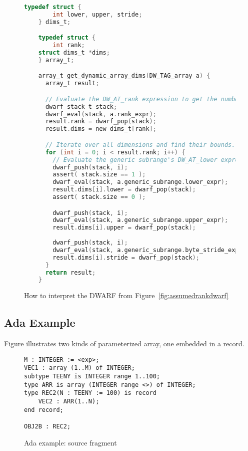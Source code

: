 \begin{figure}[!h]
\begin{lstlisting}[language=C]
    typedef struct {
        int lower, upper, stride;
    } dims_t;

    typedef struct {
        int rank;
    struct dims_t *dims;
    } array_t;

    array_t get_dynamic_array_dims(DW_TAG_array a) {
      array_t result;

      // Evaluate the DW_AT_rank expression to get the number of dimensions.
      dwarf_stack_t stack;
      dwarf_eval(stack, a.rank_expr);
      result.rank = dwarf_pop(stack); 
      result.dims = new dims_t[rank];

      // Iterate over all dimensions and find their bounds.
      for (int i = 0; i < result.rank; i++) {
        // Evaluate the generic subrange's DW_AT_lower expression for dimension i.
        dwarf_push(stack, i);
        assert( stack.size == 1 );
        dwarf_eval(stack, a.generic_subrange.lower_expr);
        result.dims[i].lower = dwarf_pop(stack);
        assert( stack.size == 0 );

        dwarf_push(stack, i);
        dwarf_eval(stack, a.generic_subrange.upper_expr);
        result.dims[i].upper = dwarf_pop(stack);
    
        dwarf_push(stack, i);
        dwarf_eval(stack, a.generic_subrange.byte_stride_expr);
        result.dims[i].stride = dwarf_pop(stack);
      }
      return result;
    }
\end{lstlisting}
\caption{How to interpret the DWARF from Figure~\ref{fig:assumedrankdwarf}}
\label{fig:assumedrankdwarfparser}
\end{figure}



\clearpage
\subsection{Ada Example}
\label{app:adaexample}
Figure 
illustrates two kinds of  
parameterized array, one embedded in a record.

\begin{figure}[here]
\begin{lstlisting}
M : INTEGER := <exp>;
VEC1 : array (1..M) of INTEGER;
subtype TEENY is INTEGER range 1..100;
type ARR is array (INTEGER range <>) of INTEGER;
type REC2(N : TEENY := 100) is record
    VEC2 : ARR(1..N);
end record;

OBJ2B : REC2;
\end{lstlisting}
\caption{Ada example: source fragment}
\label{fig:adaexamplesourcefragment}
\end{figure}

